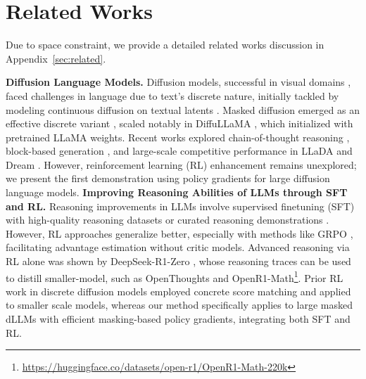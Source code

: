 \vspace{-2mm}
\section{Related Works}
\vspace{-2mm}
Due to space constraint, we provide a detailed related works discussion in Appendix~\ref{sec:related}.

\textbf{Diffusion Language Models.} Diffusion models, successful in visual domains \citep{songscore, ho2020denoising}, faced challenges in language due to text's discrete nature, initially tackled by modeling continuous diffusion on textual latents \citep{austin2021structured, gulrajani2023likelihood}. Masked diffusion emerged as an effective discrete variant \citep{austin2021structured, sahoo2024simple, shi2024simplified, ou2024your, nie2024scaling}, scaled notably in DiffuLLaMA \citep{gong2025scaling}, which initialized with pretrained LLaMA weights. Recent works explored chain-of-thought reasoning \citep{yediffusion, ye2024beyond}, block-based generation \citep{arriola2025block}, and large-scale competitive performance in LLaDA \citep{nie2025largelanguagediffusionmodels} and Dream \citep{dream2025}. However, reinforcement learning (RL) enhancement remains unexplored; we present the first demonstration using policy gradients for large diffusion language models. \textbf{Improving Reasoning Abilities of LLMs through SFT and RL.} Reasoning improvements in LLMs involve supervised finetuning (SFT) with high-quality reasoning datasets \citep{yu2023metamath, numina_math_datasets, pasteropenwebmath} or curated reasoning demonstrations \citep{ye2025limoreasoning, muennighoff2025s1, zhou2023lima}. However, RL approaches \citep{chu2025sft} generalize better, especially with methods like GRPO \citep{guo2025deepseek, shao2024deepseekmath}, facilitating advantage estimation without critic models. Advanced reasoning via RL alone was shown by DeepSeek-R1-Zero \citep{guo2025deepseek}, whose reasoning traces can be used to distill smaller-model, such as OpenThoughts \citep{openthoughts} and OpenR1-Math\footnote{\url{https://huggingface.co/datasets/open-r1/OpenR1-Math-220k}}. Prior RL work in discrete diffusion models \citep{zekri2025fine} employed concrete score matching and applied to smaller scale models, whereas our method specifically applies to large masked dLLMs with efficient masking-based policy gradients, integrating both SFT and RL.
